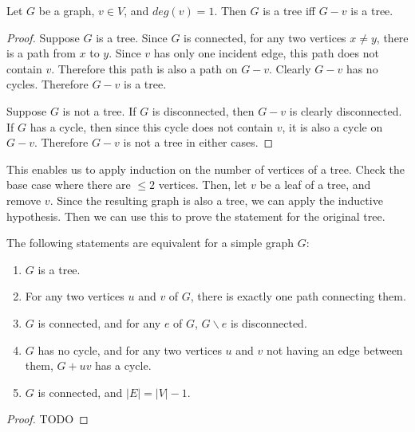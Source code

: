        \begin{lemma} \label{lem_tree_grow}
            Let $G$ be a graph, $v \in V$, and $deg(v) = 1$. Then $G$ is a tree iff $G-v$ is a tree.
        \end{lemma}
        \begin{proof}
            Suppose $G$ is a tree. Since $G$ is connected, for any two vertices $x \neq y$, there is a path from $x$ to $y$. Since $v$ has only one incident edge, this path does not contain $v$. Therefore this path is also a path on $G-v$. Clearly $G-v$ has no cycles. Therefore $G-v$ is a tree.
            
            Suppose $G$ is not a tree. If $G$ is disconnected, then $G-v$ is clearly disconnected. If $G$ has a cycle, then since this cycle does not contain $v$, it is also a cycle on $G-v$. Therefore $G-v$ is not a tree in either cases.
        \end{proof}
        
        This enables us to apply induction on the number of vertices of a tree. Check the base case where there are $\leq 2$ vertices. Then, let $v$ be a leaf of a tree, and remove $v$. Since the resulting graph is also a tree, we can apply the inductive hypothesis. Then we can use this to prove the statement for the original tree.
        
        \begin{thm} \label{thm_tree}
            The following statements are equivalent for a simple graph $G$: \begin{enumerate}
                \item $G$ is a tree.
                \item For any two vertices $u$ and $v$ of $G$, there is exactly one path connecting them.
                \item $G$ is connected, and for any $e$ of $G$, $G \backslash e$ is disconnected.
                \item $G$ has no cycle, and for any two vertices $u$ and $v$ not having an edge between them, $G+uv$ has a cycle.
                \item $G$ is connected, and $|E| = |V|-1$.
            \end{enumerate}
        \end{thm}

        \begin{proof}
            TODO
            
            
        \end{proof}
        
